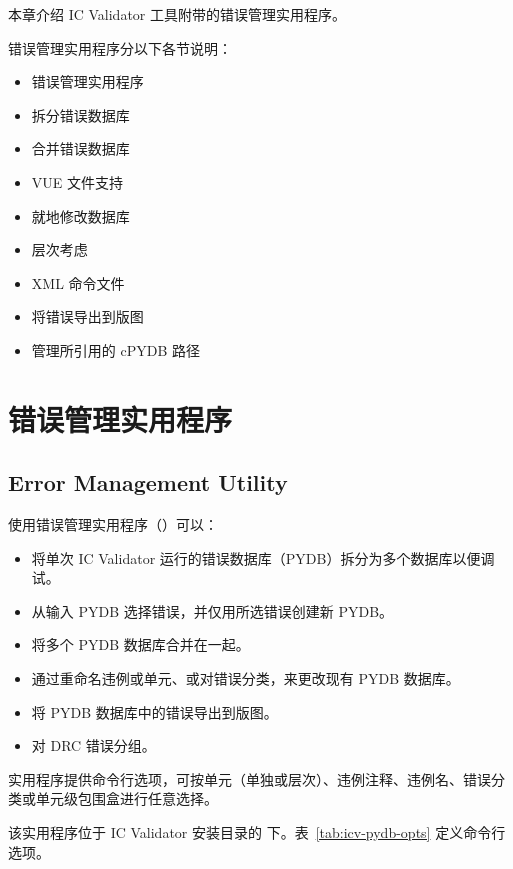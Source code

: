 \label{chap:errmgmt}

本章介绍 IC Validator 工具附带的错误管理实用程序。

错误管理实用程序分以下各节说明：
\begin{itemize}
  \item 错误管理实用程序
  \item 拆分错误数据库
  \item 合并错误数据库
  \item VUE 文件支持
  \item 就地修改数据库
  \item 层次考虑
  \item XML 命令文件
  \item 将错误导出到版图
  \item 管理所引用的 cPYDB 路径
\end{itemize}

\section{错误管理实用程序}
\subsection*{Error Management Utility}

使用错误管理实用程序（）可以：
\begin{itemize}
  \item 将单次 IC Validator 运行的错误数据库（PYDB）拆分为多个数据库以便调试。
  \item 从输入 PYDB 选择错误，并仅用所选错误创建新 PYDB。
  \item 将多个 PYDB 数据库合并在一起。
  \item 通过重命名违例或单元、或对错误分类，来更改现有 PYDB 数据库。
  \item 将 PYDB 数据库中的错误导出到版图。
  \item 对 DRC 错误分组。
\end{itemize}

 实用程序提供命令行选项，可按单元（单独或层次）、违例注释、违例名、错误分类或单元级包围盒进行任意选择。

该实用程序位于 IC Validator 安装目录的  下。表~\ref{tab:icv-pydb-opts} 定义命令行选项。

